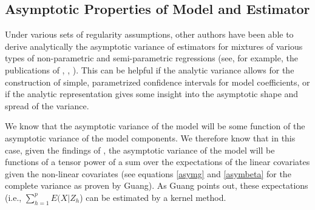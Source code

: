 \documentclass[10pt]{olplainarticle}\usepackage[]{graphicx}\usepackage[]{color}
\DeclareMathOperator*{\argmin}{argmin}
\begin{document}

\subsection{Asymptotic Properties of Model and Estimator}

Under various sets of regularity assumptions, other authors have been able to derive analytically the asymptotic variance of estimators for mixtures of various types of non-parametric and semi-parametric regressions (see, for example, the publications of \cite{zhangetal}, \cite{huang}, \cite{zhangpan}). This can be helpful if the analytic variance allows for the construction of simple, parametrized confidence intervals for model coefficients, or if the analytic representation gives some insight into the asymptotic shape and spread of the variance. 

We know that the asymptotic variance of the model will be some function of the asymptotic variance of the model components. We therefore know that in this case, given the findings of \cite{guangcheng}, the asymptotic variance of the model will be functions of a tensor power of a sum over the expectations of the linear covariates given the non-linear covariates (see equations \ref{asymg} and \ref{asymbeta} for the complete variance as proven by Guang). As Guang points out, these expectations (i.e., $\sum_{h=1}^{p} E(X|Z_h$) can be estimated by a kernel method.
\end{document}
